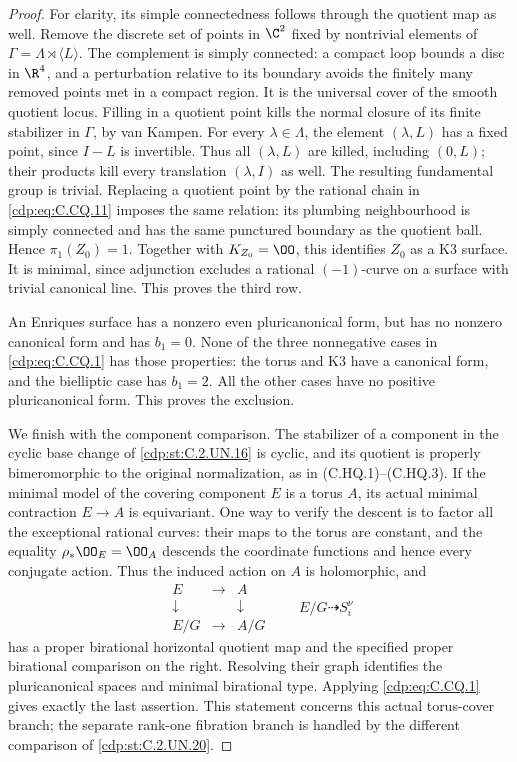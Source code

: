 \begin{proof}
For clarity, its simple connectedness follows
through the quotient map as well. Remove the
discrete set of points in $\C^2$ fixed by
nontrivial elements of
$\Gamma=\Lambda\rtimes\langle L\rangle$.
The complement is simply connected: a compact
loop bounds a disc in $\R^4$, and a perturbation
relative to its boundary avoids the finitely
many removed points met in a compact region.
It is the universal cover of the smooth
quotient locus. Filling in a quotient point
kills the normal closure of its finite
stabilizer in $\Gamma$, by van Kampen.
For every $\lambda\in\Lambda$, the element
$(\lambda,L)$ has a fixed point, since $I-L$
is invertible. Thus all $(\lambda,L)$ are
killed, including $(0,L)$; their products
kill every translation $(\lambda,I)$ as well.
The resulting fundamental group is trivial.
Replacing a quotient point by the rational
chain in \eqref{cdp:eq:C.CQ.11} imposes the same relation:
its plumbing neighbourhood is simply connected
and has the same punctured boundary as the
quotient ball. Hence $\pi_1(Z_0)=1$.
Together with $K_{Z_0}=\OO$, this identifies
$Z_0$ as a K3 surface. It is minimal, since
adjunction excludes a rational $(-1)$-curve
on a surface with trivial canonical line.
This proves the third row.

An Enriques surface has a nonzero even
pluricanonical form, but has no nonzero
canonical form and has $b_1=0$. None of
the three nonnegative cases in \eqref{cdp:eq:C.CQ.1}
has those properties: the torus and K3
have a canonical form, and the bielliptic
case has $b_1=2$. All the other cases
have no positive pluricanonical form.
This proves the exclusion.

We finish with the component comparison.
The stabilizer of a component in the
cyclic base change of \ref{cdp:st:C.2.UN.16} is cyclic,
and its quotient is properly bimeromorphic
to the original normalization, as in
(C.HQ.1)--(C.HQ.3). If the minimal model
of the covering component $E$ is a torus
$A$, its actual minimal contraction
$E\to A$ is equivariant. One way to
verify the descent is to factor all the
exceptional rational curves: their maps
to the torus are constant, and the
equality $\rho_*\OO_E=\OO_A$ descends
the coordinate functions and hence
every conjugate action. Thus the induced
action on $A$ is holomorphic, and
\[
 \begin{array}{ccc}
 E&\longrightarrow&A\\
 \downarrow&&\downarrow\\
 E/G&\longrightarrow&A/G
 \end{array}
 \qquad
             E/G\dashrightarrow S_i^\nu
                                                               \tag{C.CQ.12}\label{cdp:eq:C.CQ.12}
\]
has a proper birational horizontal quotient
map and the specified proper birational
comparison on the right. Resolving their
graph identifies the pluricanonical
spaces and minimal birational type.
Applying \eqref{cdp:eq:C.CQ.1} gives exactly the last
assertion. This statement concerns this
actual torus-cover branch; the separate
rank-one fibration branch is handled by
the different comparison of \ref{cdp:st:C.2.UN.20}.
\end{proof}

